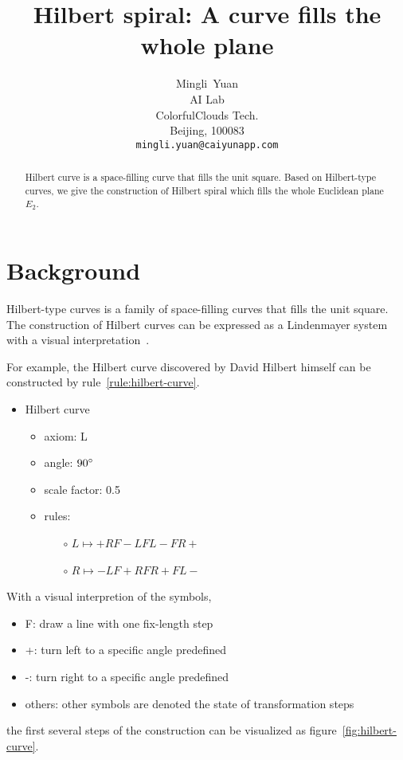 \documentclass{article}
\title{Hilbert spiral: A curve fills the whole plane}
\author{
  Mingli~Yuan \\
  AI Lab \\
  ColorfulClouds Tech.\\
  Beijing, 100083 \\
  \texttt{mingli.yuan@caiyunapp.com} \\
}
\begin{document}
\maketitle

\begin{abstract}
    Hilbert curve is a space-filling curve that fills the unit square.
    Based on Hilbert-type curves, we give the construction of Hilbert spiral
    which fills the whole Euclidean plane $E_2$.
\end{abstract}


\setcounter{tocdepth}{2}
\tableofcontents

\section{Background}\label{sec:background}

Hilbert-type curves is a family of space-filling curves that fills the unit square.
The construction of Hilbert curves can be expressed as a Lindenmayer system with a visual interpretation~\cite{Prusinkiewicz1990TheAB}.

For example, the Hilbert curve discovered by David Hilbert himself can be constructed by
rule~\ref{rule:hilbert-curve}.

\begin{itemize}
    \label{rule:hilbert-curve}
    \item Hilbert curve
    \begin{itemize}
      \item axiom: L
      \item angle: $90\degree$
      \item scale factor: 0.5
      \item rules: \begin{itemize}
          \item[$\circ$] $L \mapsto +RF-LFL-FR+ $
          \item[$\circ$] $R \mapsto -LF+RFR+FL- $
      \end{itemize}
    \end{itemize}
\end{itemize}

With a visual interpretion of the symbols,
\begin{itemize}
  \item F: draw a line with one fix-length step
  \item +: turn left to a specific angle predefined
  \item -: turn right to a specific angle predefined
  \item others: other symbols are denoted the state of transformation steps
\end{itemize}
the first several steps of the construction can be visualized as figure~\ref{fig:hilbert-curve}.
\end{document}
